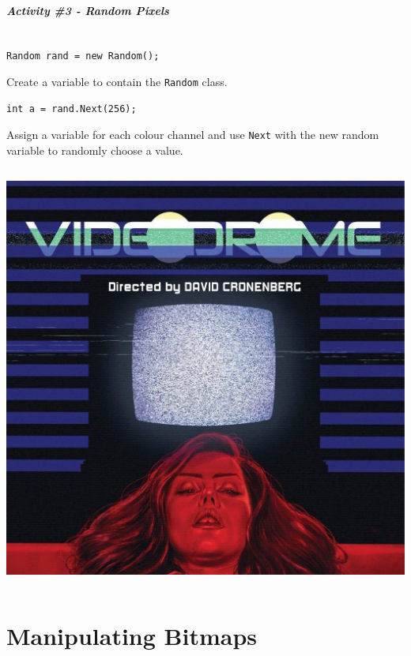 \begin{frame}[fragile]
	\frametitle{Activity \#3 - Random Pixels}
\begin{setting Fromcolumns}
	\begin{column}{0.48\textwidth}
	\begin{lstlisting}
Random rand = new Random();
	\end{lstlisting}
Create a variable to contain the \texttt{Random} class.
	\begin{lstlisting}
int a = rand.Next(256);
	\end{lstlisting}
Assign a variable for each colour channel and use \texttt{Next} with the new random variable to randomly choose a value.

\end{column}
 \begin{column}{0.48\textwidth}
\includegraphics[scale=0.14]{videodrome}
\end{column}
\end{setting Fromcolumns}
\end{frame}

\part{Manipulating Bitmaps}
\frame{\partpage}

